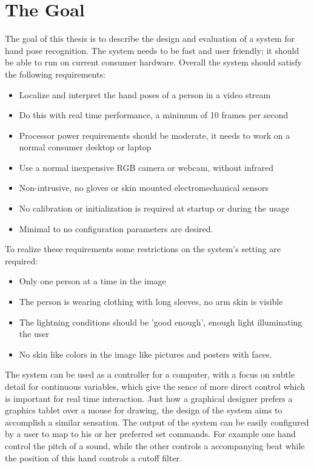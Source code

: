 \section{The Goal}
\label{sec:goal}
The goal of this thesis is to describe the design and evaluation of a system for hand pose recognition. The system needs to be fast and user friendly; it should be able to run on current consumer hardware. Overall the system should satisfy the following requirements:

\begin{itemize}
	\item Localize and interpret the hand poses of a person in a video stream
	\item Do this with real time performance, a minimum of 10 frames per second
	\item Processor power requirements should be moderate, it needs to work on a normal consumer desktop or laptop
	\item Use a normal inexpensive RGB camera or webcam, without infrared
	\item Non-intrusive, no gloves or skin mounted electromechanical sensors
	\item No calibration or initialization is required at startup or during the usage
	\item Minimal to no configuration parameters are desired.
\end{itemize}
	
To realize these requirements some restrictions on the system's setting are required:

\begin{itemize}
	\item Only one person at a time in the image
	\item The person is wearing clothing with long sleeves, no arm skin is visible
	\item The lightning conditions should be 'good enough', enough light illuminating the user
	\item No skin like colors in the image like pictures and posters with faces.
\end{itemize}

The system can be used as a controller for a computer, with a focus on subtle detail for continuous variables, which give the sence of more direct control which is important for real time interaction. Just how a graphical designer prefers a graphics tablet over a mouse for drawing, the design of the system aims to accomplish a similar sensation. The output of the system can be easily configured by a user to map to his or her preferred set commands. For example one hand control the pitch of a sound, while the other controls a accompanying beat while the position of this hand controls a cutoff filter. 

